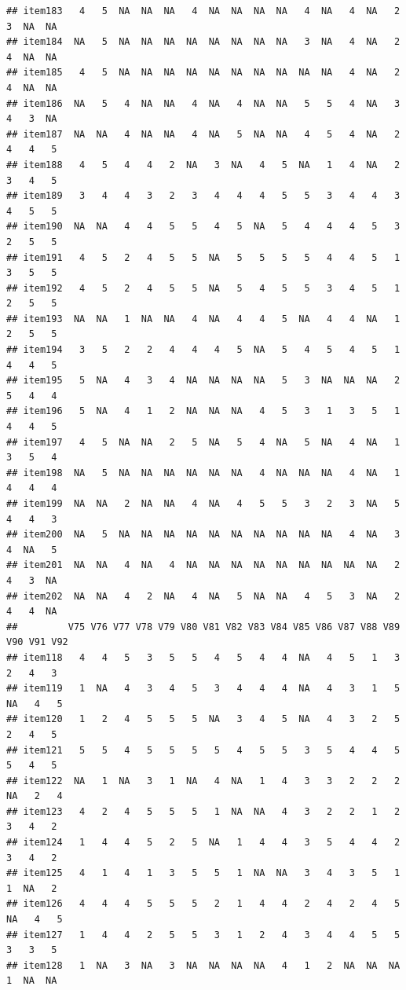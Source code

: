 \documentclass[
  man]{apa6}
\begin{document}
\begin{verbatim}
## item183   4   5  NA  NA  NA   4  NA  NA  NA  NA   4  NA   4  NA   2   3  NA  NA
## item184  NA   5  NA  NA  NA  NA  NA  NA  NA  NA   3  NA   4  NA   2   4  NA  NA
## item185   4   5  NA  NA  NA  NA  NA  NA  NA  NA  NA  NA   4  NA   2   4  NA  NA
## item186  NA   5   4  NA  NA   4  NA   4  NA  NA   5   5   4  NA   3   4   3  NA
## item187  NA  NA   4  NA  NA   4  NA   5  NA  NA   4   5   4  NA   2   4   4   5
## item188   4   5   4   4   2  NA   3  NA   4   5  NA   1   4  NA   2   3   4   5
## item189   3   4   4   3   2   3   4   4   4   5   5   3   4   4   3   4   5   5
## item190  NA  NA   4   4   5   5   4   5  NA   5   4   4   4   5   3   2   5   5
## item191   4   5   2   4   5   5  NA   5   5   5   5   4   4   5   1   3   5   5
## item192   4   5   2   4   5   5  NA   5   4   5   5   3   4   5   1   2   5   5
## item193  NA  NA   1  NA  NA   4  NA   4   4   5  NA   4   4  NA   1   2   5   5
## item194   3   5   2   2   4   4   4   5  NA   5   4   5   4   5   1   4   4   5
## item195   5  NA   4   3   4  NA  NA  NA  NA   5   3  NA  NA  NA   2   5   4   4
## item196   5  NA   4   1   2  NA  NA  NA   4   5   3   1   3   5   1   4   4   5
## item197   4   5  NA  NA   2   5  NA   5   4  NA   5  NA   4  NA   1   3   5   4
## item198  NA   5  NA  NA  NA  NA  NA  NA   4  NA  NA  NA   4  NA   1   4   4   4
## item199  NA  NA   2  NA  NA   4  NA   4   5   5   3   2   3  NA   5   4   4   3
## item200  NA   5  NA  NA  NA  NA  NA  NA  NA  NA  NA  NA   4  NA   3   4  NA   5
## item201  NA  NA   4  NA   4  NA  NA  NA  NA  NA  NA  NA  NA  NA   2   4   3  NA
## item202  NA  NA   4   2  NA   4  NA   5  NA  NA   4   5   3  NA   2   4   4  NA
##         V75 V76 V77 V78 V79 V80 V81 V82 V83 V84 V85 V86 V87 V88 V89 V90 V91 V92
## item118   4   4   5   3   5   5   4   5   4   4  NA   4   5   1   3   2   4   3
## item119   1  NA   4   3   4   5   3   4   4   4  NA   4   3   1   5  NA   4   5
## item120   1   2   4   5   5   5  NA   3   4   5  NA   4   3   2   5   2   4   5
## item121   5   5   4   5   5   5   5   4   5   5   3   5   4   4   5   5   4   5
## item122  NA   1  NA   3   1  NA   4  NA   1   4   3   3   2   2   2  NA   2   4
## item123   4   2   4   5   5   5   1  NA  NA   4   3   2   2   1   2   3   4   2
## item124   1   4   4   5   2   5  NA   1   4   4   3   5   4   4   2   3   4   2
## item125   4   1   4   1   3   5   5   1  NA  NA   3   4   3   5   1   1  NA   2
## item126   4   4   4   5   5   5   2   1   4   4   2   4   2   4   5  NA   4   5
## item127   1   4   4   2   5   5   3   1   2   4   3   4   4   5   5   3   3   5
## item128   1  NA   3  NA   3  NA  NA  NA  NA   4   1   2  NA  NA  NA   1  NA  NA

\end{verbatim}
\end{document}
